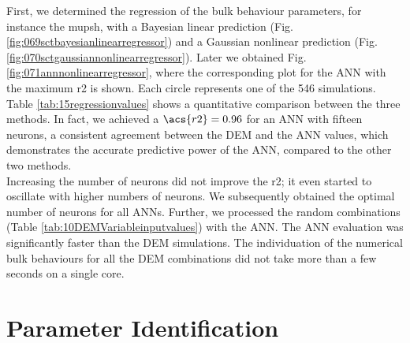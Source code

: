 First, we determined the regression of the bulk behaviour parameters, for
instance the \acs{mupsh}, 
with a Bayesian linear prediction (Fig.
\ref{fig:069sctbayesianlinearregressor}) and a Gaussian nonlinear prediction
(Fig.  \ref{fig:070sctgaussiannonlinearregressor}). 
Later we obtained Fig.
\ref{fig:071annnonlinearregressor}, where the corresponding plot for the \acs{ANN} with the maximum \acs{r2} is shown. 
Each circle represents one of the 546 simulations.
Table \ref{tab:15regressionvalues} shows a quantitative comparison between the
three methods. 
In fact, 
we achieved a $\acs{r2} = 0.96$ for an \acs{ANN} with fifteen neurons,
a consistent agreement between the 
\acs{DEM} and the \acs{ANN} values, which demonstrates the accurate predictive power of
the \acs{ANN}, compared to the other two methods.\\ 
Increasing the number of neurons did not improve the \acs{r2}; it even started to
oscillate with higher numbers of neurons.
We subsequently obtained the optimal number of neurons for all \acs{ANNs}.
Further, we processed the random combinations (Table
\ref{tab:10DEMVariableinputvalues}) with the \acs{ANN}.
The \acs{ANN} evaluation was significantly faster than the \acs{DEM} simulations. The
individuation of the numerical bulk behaviours for all the \acs{DEM} combinations
did not take more than a few seconds on a single core.



  

\section{Parameter Identification}
\label{sec:parameteridentification}

